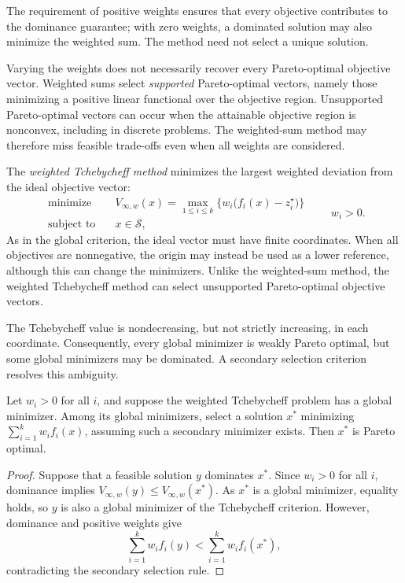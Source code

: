 The requirement of positive weights ensures that every objective contributes to the dominance guarantee; with zero weights, a dominated solution may also minimize the weighted sum. The method need not select a unique solution.

Varying the weights does not necessarily recover every Pareto-optimal objective vector. Weighted sums select \emph{supported} Pareto-optimal vectors, namely those minimizing a positive linear functional over the objective region. Unsupported Pareto-optimal vectors can occur when the attainable objective region is nonconvex, including in discrete problems. The weighted-sum method may therefore miss feasible trade-offs even when all weights are considered.

The \emph{weighted Tchebycheff method} minimizes the largest weighted deviation from the ideal objective vector:
\[
\begin{aligned}
\text{minimize}\quad & V_{\infty,w}(x)
=\max_{1\leq i\leq k}\bigl\{w_i\bigl(f_i(x)-z_i^{\star}\bigr)\bigr\}\\
\text{subject to}\quad & x\in\mathcal{S},
\end{aligned}
\qquad w_i>0.
\]
As in the global criterion, the ideal vector must have finite coordinates. When all objectives are nonnegative, the origin may instead be used as a lower reference, although this can change the minimizers. Unlike the weighted-sum method, the weighted Tchebycheff method can select unsupported Pareto-optimal objective vectors.

The Tchebycheff value is nondecreasing, but not strictly increasing, in each coordinate. Consequently, every global minimizer is weakly Pareto optimal, but some global minimizers may be dominated. A secondary selection criterion resolves this ambiguity.

\begin{proposition}
\label{prop:weighted_tchebycheff_pareto_optimal}
Let $w_i>0$ for all $i$, and suppose the weighted Tchebycheff problem has a global minimizer. Among its global minimizers, select a solution $x^*$ minimizing $\sum_{i=1}^{k}w_i f_i(x)$, assuming such a secondary minimizer exists. Then $x^*$ is Pareto optimal.
\end{proposition}
\begin{proof}
Suppose that a feasible solution $y$ dominates $x^*$. Since $w_i>0$ for all $i$, dominance implies $V_{\infty,w}(y)\leq V_{\infty,w}(x^*)$. As $x^*$ is a global minimizer, equality holds, so $y$ is also a global minimizer of the Tchebycheff criterion. However, dominance and positive weights give
\[
\sum_{i=1}^{k}w_i f_i(y)<\sum_{i=1}^{k}w_i f_i(x^*),
\]
contradicting the secondary selection rule.
\end{proof}

